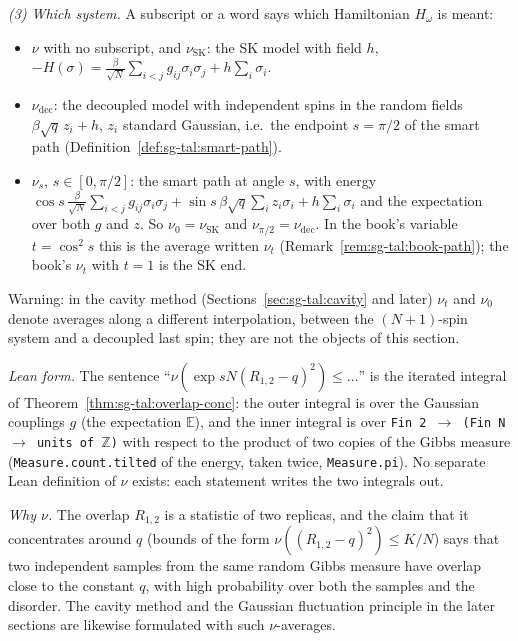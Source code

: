 \begin{remark}
\emph{(3) Which system.} A subscript or a word says which Hamiltonian $H_\omega$ is meant:
\begin{itemize}
\item $\nu$ with no subscript, and $\nu_{\mathrm{SK}}$: the SK model with field $h$, $-H(\sigma)=\frac{\beta}{\sqrt N}\sum_{i<j}g_{ij}\sigma_i\sigma_j+h\sum_i\sigma_i$.
\item $\nu_{\mathrm{dec}}$: the decoupled model with independent spins in the random fields $\beta\sqrt q\,z_i+h$, $z_i$ standard Gaussian, i.e.\ the endpoint $s=\pi/2$ of the smart path (Definition~\ref{def:sg-tal:smart-path}).
\item $\nu_s$, $s\in[0,\pi/2]$: the smart path at angle $s$, with energy $\cos s\,\frac{\beta}{\sqrt N}\sum_{i<j}g_{ij}\sigma_i\sigma_j+\sin s\,\beta\sqrt q\sum_iz_i\sigma_i+h\sum_i\sigma_i$ and the expectation over both $g$ and $z$. So $\nu_0=\nu_{\mathrm{SK}}$ and $\nu_{\pi/2}=\nu_{\mathrm{dec}}$. In the book's variable $t=\cos^2 s$ this is the average written $\nu_t$ (Remark~\ref{rem:sg-tal:book-path}); the book's $\nu_t$ with $t=1$ is the SK end.
\end{itemize}
Warning: in the cavity method (Sections~\ref{sec:sg-tal:cavity} and later) $\nu_t$ and $\nu_0$ denote averages along a different interpolation, between the $(N+1)$-spin system and a decoupled last spin; they are not the objects of this section.

\emph{Lean form.} The sentence ``$\nu(\exp sN(R_{1,2}-q)^2)\le\dots$'' is the iterated integral of Theorem~\ref{thm:sg-tal:overlap-conc}: the outer integral is over the Gaussian couplings $g$ (the expectation $\mathbb{E}$), and the inner integral is over \texttt{Fin 2 $\to$ (Fin N $\to$ units of $\mathbb{Z}$)} with respect to the product of two copies of the Gibbs measure (\texttt{Measure.count.tilted} of the energy, taken twice, \texttt{Measure.pi}). No separate Lean definition of $\nu$ exists: each statement writes the two integrals out.

\emph{Why $\nu$.} The overlap $R_{1,2}$ is a statistic of two replicas, and the claim that it concentrates around $q$ (bounds of the form $\nu((R_{1,2}-q)^2)\le K/N$) says that two independent samples from the same random Gibbs measure have overlap close to the constant $q$, with high probability over both the samples and the disorder. The cavity method and the Gaussian fluctuation principle in the later sections are likewise formulated with such $\nu$-averages.
\end{remark}

